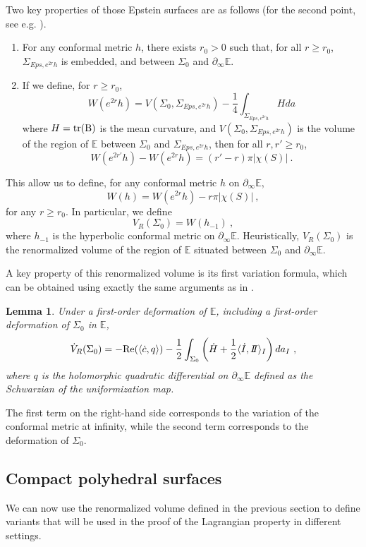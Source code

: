 \documentclass[notitlepage,twoside,a4paper]{amsart}
\newcommand{\II}{I\hspace{-0.1cm}I}
\newtheorem{lemma}[theorem]{\rm\bf Lemma}
\theoremstyle{named}
\newcommand{\bE}{{\mathbb E}}
\newcommand{\tr}{\rm{tr}}
\newcommand{\Sigeps}[1]{{\Sigma_{Eps,#1}}}
\newcounter{notes}%
\newcommand{\marginnote}[1]{
\refstepcounter{notes}  %
\nolinebreak
$\hspace{-5pt}{}^{\text{\tiny \rm \arabic{notes}}}$
\marginpar{\tiny \arabic{notes}) #1}
}
\begin{document}
Two key properties of those Epstein surfaces are as follows (for the second point, see e.g. \cite[Lemma 3.6]{compare}).
\begin{enumerate}
\item For any conformal metric $h$, there exists $r_0>0$ such that, for all $r\geq r_0$, $\Sigeps{e^{2r}h}$ is embedded, and between $\Sigma_0$ and $\partial_\infty\bE$.
\item If we define, for $r\geq r_0$,
  $$ W(e^{2r}h) = V(\Sigma_0, \Sigeps{e^{2r}h}) - \frac 14\int_{\Sigeps{e^{2r}h}}H da$$
  where $H=\tr(B)$ is the mean curvature, and $V(\Sigma_0, \Sigeps{e^{2r}h})$ is the volume of the region of $\bE$ between $\Sigma_0$ and $\Sigeps{e^{2r}h}$, then for all $r,r'\geq r_0$, 
  $$ W(e^{2r'}h) - W(e^{2r}h) = (r'-r)\pi |\chi(S)|~. $$
\end{enumerate}
This allow us to define, for any conformal metric $h$ on $\partial_\infty\bE$,
$$ W(h) = W(e^{2r}h) - r\pi  |\chi(S)|~, $$
for any $r\geq r_0$. In particular, we define
$$ V_R(\Sigma_0) = W(h_{-1})~, $$
where $h_{-1}$ is the hyperbolic conformal metric on $\partial_\infty\bE$. Heuristically, $V_R(\Sigma_0)$ is the renormalized volume of the region of $\bE$ situated between $\Sigma_0$ and $\partial_\infty\bE$. 

A key property of this renormalized volume is its first variation formula, which can be obtained using exactly the same arguments as in \cite[Section 6]{volume}.

\begin{lemma}
  Under a first-order deformation of $\bE$, including a first-order deformation of $\Sigma_0$ in $\bE$, 
  $$ \dot V_R(\Sigma_0) = - \mathrm{Re}(\langle \dot c,q\rangle) - \frac 12 \int_{\Sigma_0}\left(\dot H +\frac 12 \langle \dot I, \II\rangle_I\right)da_I~, $$
  where $q$ is the holomorphic quadratic differential on $\partial_\infty\bE$ defined as the Schwarzian of the uniformization map.%
\end{lemma}

The first term on the right-hand side corresponds to the variation of the conformal metric at infinity, while the second term corresponds to the deformation of $\Sigma_0$.

\subsection{Compact polyhedral surfaces}

We can now use the renormalized volume defined in the previous section to define variants that will be used in the proof of the Lagrangian property in different settings.
\end{document}
